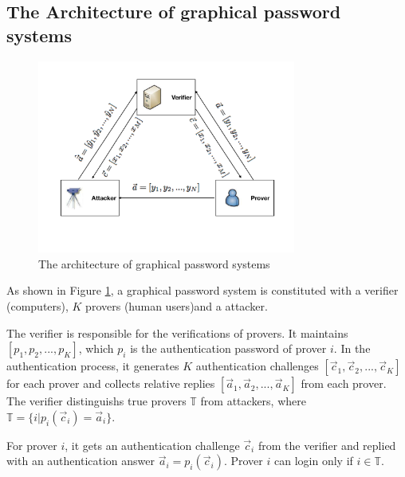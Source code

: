 \documentclass{article}
\begin{document}
  \subsection{The Architecture of graphical password systems}
  \begin{figure}[htb]
    \centering
    \includegraphics[width=8.5cm]{architecture.pdf}
    \caption{The architecture of graphical password systems}
    \label{fig:architecture}
  \end{figure}
  As shown in Figure \ref{fig:architecture}, a graphical password system is constituted with a verifier (computers), 
  $K$ provers (human users)and a attacker. 
  
  The verifier is responsible for the verifications of provers. It maintains $[p_1, p_2,...,p_{K}]$, 
  which $p_i$ is the authentication password of prover $i$. In the authentication process, it generates $K$ 
  authentication challenges $[\vec{c}_1, \vec{c}_2,...,\vec{c}_{K}]$ for each prover and collects relative replies 
  $[\vec{a}_1,\vec{a}_2,...,\vec{a}_{K}]$ from each prover. The verifier distinguishs true provers $\mathbb{T}$ 
  from attackers, where $\mathbb{T} = \{i|p_i(\vec{c}_i) = \vec{a}_i\}$.

  For prover $i$, it gets an authentication challenge $\vec{c}_i$ from the verifier and replied with an 
  authentication answer $\vec{a}_i = p_i(\vec{c}_i)$. Prover $i$ can login only if $i \in \mathbb{T}$. 
  
\end{document}
